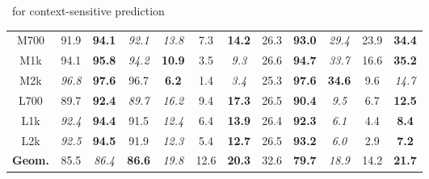 \documentclass[first=dgreen,second=purple,logo=red]{aaltoslides}
\begin{document}
\begin{frame}{\spin\ for context-sensitive prediction}
\begin{table}[t]
\begin{tabular}{|@{  }c@{  }|@{}c@{  }c@{  }c@{}|@{}c@{  }c@{  }c@{}|@{}c@{ }c@{}|@{}c@{  }c@{  }c@{}|}
		M700  & {91.9} & \textbf{94.1} & \em{92.1} & \em{13.8} & {7.3} & \textbf{14.2}  & {26.3} & \textbf{93.0} & \em{29.4} & {23.9} & \textbf{34.4} \\ 
		M1k & {94.1} & \textbf{95.8} & \em{94.2} & \textbf{10.9} & {3.5} & \em{9.3}   & {26.6} & \textbf{94.7} & \em{33.7} & {16.6} & \textbf{35.2} \\ 
		M2k & \em{96.8} & \textbf{97.6} & {96.7} & \textbf{6.2} & {1.4} & \em{3.4}    & {25.3} & \textbf{97.6} & \textbf{34.6} & {9.6} & \em{14.7} \\ 
		L700  & {89.7} & \textbf{92.4} & \em{89.7} & \em{16.2} & {9.4} & \textbf{17.3}  & {26.5} & \textbf{90.4} & \em{9.5} & {6.7} & \textbf{12.5} \\ 
		L1k & \em{92.4} & \textbf{94.4} & {91.5} & \em{12.4} & {6.4} & \textbf{13.9}  & {26.4} & \textbf{92.3} & \em{6.1} & {4.4} & \textbf{8.4} \\ 
		L2k & \em{92.5} & \textbf{94.5} & {91.9} & \em{12.3} & {5.4} & \textbf{12.7}  & {26.5} & \textbf{93.2} & \em{6.0} & {2.9} & \textbf{7.2} \\ \hline
		\textbf{Geom.}  & {85.5} & \em{86.4} & \textbf{86.6} & \em{19.8} & {12.6} & \textbf{20.3} & {32.6} & \textbf{79.7} & \em{18.9} & {14.2} & \textbf{21.7} \\
		\hline
		\end{tabular}
		\label{table_global_res_svm}
		\end{table}
\end{frame}
\end{document}
